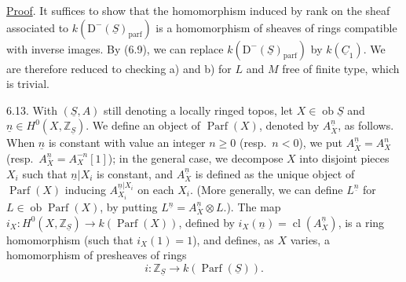 \providecommand{\Cpx}{\mathrm C}
\providecommand{\Kpx}{\mathrm K}
\providecommand{\Dpx}{\mathrm D}
\providecommand{\Ho}{\mathrm H}
\providecommand{\RHom}{\mathrm R\!\operatorname{Hom}}
\renewcommand{\Ob}{\operatorname{ob}}
\providecommand{\Hom}{\operatorname{Hom}}
\providecommand{\RHom}{\mathrm R\!\operatorname{Hom}}
\providecommand{\Ext}{\operatorname{Ext}}
\providecommand{\Tor}{\operatorname{Tor}}
\providecommand{\Tr}{\operatorname{Tr}}
\providecommand{\Add}{\operatorname{Add}}
\providecommand{\Cart}{\underline{\operatorname{Cart}}}
\providecommand{\Parf}{\operatorname{Parf}}
\providecommand{\coh}{\operatorname{coh}}
\providecommand{\amp}{\operatorname{amp}}
\providecommand{\cl}{\operatorname{cl}}
\providecommand{\rg}{\operatorname{rg}}
\providecommand{\Id}{\operatorname{Id}}
\providecommand{\Ker}{\operatorname{Ker}}
\renewcommand{\Im}{\operatorname{Im}}
\providecommand{\cH}{\mathcal H}
\providecommand{\Zs}{\mathbb Z_S}
\providecommand{\A}{\mathcal A}
\providecommand{\cC}{\mathcal C}
\providecommand{\cCzero}{\mathcal C_0}
\providecommand{\otL}{\mathop{\otimes}^{\mathrm L}}
\providecommand{\tamp}{\operatorname{tor.amp}}
\providecommand{\pamp}{\operatorname{parf.amp}}
\providecommand{\pdim}{\operatorname{parf.dim}}
\providecommand{\bon}{\mathrm b}
\providecommand{\parf}{\operatorname{parf}}
\providecommand{\parff}{\operatorname{parf}}
\providecommand{\ac}{\mathrm{ac}}


\providecommand{\End}{\operatorname{End}}
\providecommand{\tr}{\operatorname{tr}}

%
\uline{Proof}. It suffices to show that the homomorphism induced by rank on the sheaf associated to \(k(\Dpx^-(\underline{S})_{\mathrm{parf}})\) is a homomorphism of sheaves of rings compatible with inverse images. By (6.9), we can replace \(k(\Dpx^-(\underline{S})_{\mathrm{parf}})\) by \(k(\underline{C}_1)\). We are therefore reduced to checking a) and b) for \(L\) and \(M\) free of finite type, which is trivial.

6.13. With \((\underline{S},A)\) still denoting a locally ringed topos, let \(X\in\Ob \underline{S}\) and \(\underline n\in H^0(X,\mathbb Z_{\underline{S}})\). We define an object of \(\Parf(X)\), denoted by \(A_X^{\underline n}\), as follows. When \(\underline n\) is constant with value an integer \(n\geq0\) (resp.\ \(n<0\)), we put \(A_X^{\underline n}=A_X^n\) (resp.\ \(A_X^{\underline n}=A_X^{-n}[1]\)); in the general case, we decompose \(X\) into disjoint pieces \(X_i\) such that \(\underline n|X_i\) is constant, and \(A_X^{\underline n}\) is defined as the unique object of \(\Parf(X)\) inducing \(A_{X_i}^{\underline n|X_i}\) on each \(X_i\). (More generally, we can define \(L^{\underline n}\) for \(L\in\Ob\Parf(X)\), by putting \(L^{\underline n}=A_X^{\underline n}\otimes L\).).
The map \(i_X:H^0(X,\mathbb Z_{\underline{S}})\longrightarrow k(\Parf(X))\), defined by \(i_X(\underline n)=\cl(A_X^{\underline n})\), is a ring homomorphism (such that \(i_X(1)=1\)), and defines, as \(X\) varies, a homomorphism of presheaves of rings
\[
  i:\mathbb Z_{\underline{S}}\longrightarrow k(\Parf(\underline{S})).
\]

